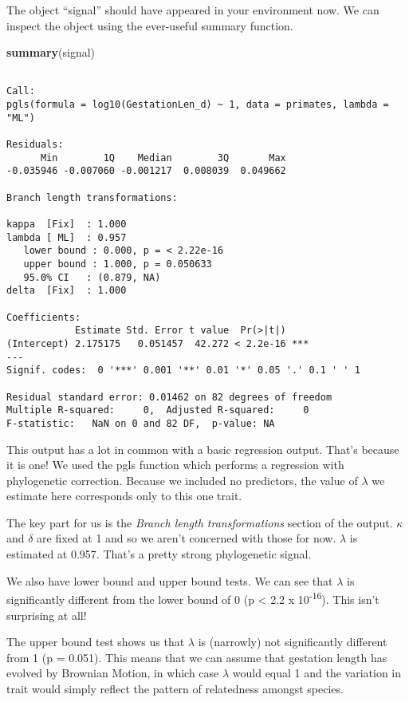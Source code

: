 \documentclass[]{book}
\newenvironment{Shaded}{\begin{snugshade}}{\end{snugshade}}
\newcommand{\KeywordTok}[1]{\textcolor[rgb]{0.13,0.29,0.53}{\textbf{#1}}}
\newcommand{\NormalTok}[1]{#1}
\begin{document}
The object ``signal'' should have appeared in your environment now. We
can inspect the object using the ever-useful summary function.

\begin{Shaded}
\begin{Highlighting}[]
\KeywordTok{summary}\NormalTok{(signal)}
\end{Highlighting}
\end{Shaded}

\begin{verbatim}

Call:
pgls(formula = log10(GestationLen_d) ~ 1, data = primates, lambda = "ML")

Residuals:
      Min        1Q    Median        3Q       Max 
-0.035946 -0.007060 -0.001217  0.008039  0.049662 

Branch length transformations:

kappa  [Fix]  : 1.000
lambda [ ML]  : 0.957
   lower bound : 0.000, p = < 2.22e-16
   upper bound : 1.000, p = 0.050633
   95.0% CI   : (0.879, NA)
delta  [Fix]  : 1.000

Coefficients:
            Estimate Std. Error t value  Pr(>|t|)    
(Intercept) 2.175175   0.051457  42.272 < 2.2e-16 ***
---
Signif. codes:  0 '***' 0.001 '**' 0.01 '*' 0.05 '.' 0.1 ' ' 1

Residual standard error: 0.01462 on 82 degrees of freedom
Multiple R-squared:     0,  Adjusted R-squared:     0 
F-statistic:   NaN on 0 and 82 DF,  p-value: NA 
\end{verbatim}

This output has a lot in common with a basic regression output. That's
because it is one! We used the pgls function which performs a regression
with phylogenetic correction. Because we included no predictors, the
value of \(\lambda\) we estimate here corresponds only to this one
trait.

The key part for us is the \textit{Branch length transformations}
section of the output. \(\kappa\) and \(\delta\) are fixed at 1 and so
we aren't concerned with those for now. \(\lambda\) is estimated at
0.957. That's a pretty strong phylogenetic signal.

We also have lower bound and upper bound tests. We can see that
\(\lambda\) is significantly different from the lower bound of 0 (p
\textless{} 2.2 x 10\textsuperscript{-16}). This isn't surprising at
all!

The upper bound test shows us that \(\lambda\) is (narrowly) not
significantly different from 1 (p = 0.051). This means that we can
assume that gestation length has evolved by Brownian Motion, in which
case \(\lambda\) would equal 1 and the variation in trait would simply
reflect the pattern of relatedness amongst species.
\end{document}
